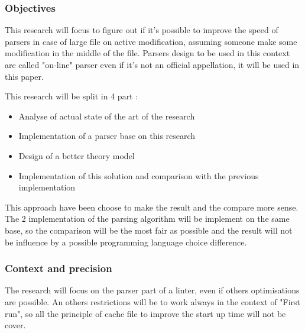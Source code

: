 \subsubsection{Objectives}
This research will focus to figure out if it's possible to improve the speed of parsers in case of large file on active modification, assuming someone make some modification in the middle of the file. Parsers design to be used in this context are called "on-line" parser even if it's not an official appellation, it will be used in this paper.

This research will be split in 4 part :
\begin{itemize}
\item Analyse of actual state of the art of the research
\item Implementation of a parser base on this research
\item Design of a better theory model
\item Implementation of this solution and comparison with the previous implementation
\end{itemize}

This approach have been choose to make the result and the compare more sense. The 2 implementation of the parsing algorithm will be implement on the same base, so the comparison will be the most fair as possible and the result will not be influence by a possible programming language choice difference.
\\
\subsubsection{Context and precision}
The research will focus on the parser part of a linter, even if others optimisations are possible.
An others restrictions will be to work always in the context of "First run", so all the principle of cache file to improve the start up time will not be cover.
